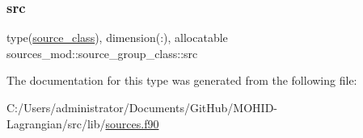 \subsubsection{\texorpdfstring{src}{src}}
{\footnotesize\ttfamily type(\hyperlink{structsources__mod_1_1source__class}{source\+\_\+class}), dimension(\+:), allocatable sources\+\_\+mod\+::source\+\_\+group\+\_\+class\+::src\hspace{0.3cm}{\ttfamily [private]}}



The documentation for this type was generated from the following file\+:\begin{DoxyCompactItemize}
\item 
C\+:/\+Users/administrator/\+Documents/\+Git\+Hub/\+M\+O\+H\+I\+D-\/\+Lagrangian/src/lib/\hyperlink{sources_8f90}{sources.\+f90}\end{DoxyCompactItemize}
